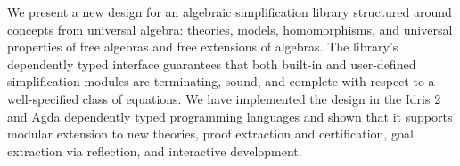 We present a new design for an algebraic simplification library
structured around concepts from universal algebra: theories,
models, homomorphisms, and universal properties of free algebras and
free extensions of algebras.
%
The library's dependently typed interface guarantees that
both built-in and user-defined simplification modules are terminating,
sound, and complete with respect to a well-specified class of
equations.
%
We have implemented the design in the Idris 2 and Agda dependently
typed programming languages and shown that it supports modular
extension to new theories, proof extraction and certification, goal
extraction via reflection, and interactive development.
